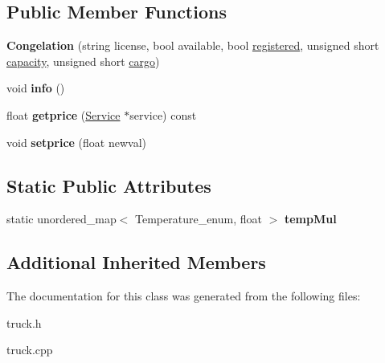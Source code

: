 \subsection*{Public Member Functions}
\begin{DoxyCompactItemize}
\item 
\mbox{\label{class_congelation_a320f8a45809dbe0d770f9f77d49b3629}} 
{\bfseries Congelation} (string license, bool available, bool \hyperlink{class_truck_a80b8405cf7a15b236fef70116f99c4fb}{registered}, unsigned short \hyperlink{class_truck_a14541fad6d47c606ce4e1bd150a68a23}{capacity}, unsigned short \hyperlink{class_truck_a968fc6b1a6171a03e4254d6615da4ecd}{cargo})
\item 
\mbox{\label{class_congelation_ac2f7cb9aeeeb9428a9a973e6a2c63942}} 
void {\bfseries info} ()
\item 
\mbox{\label{class_congelation_a5a37727f0b16e4d250e4576c637392ea}} 
float {\bfseries getprice} (\hyperlink{class_service}{Service} $\ast$service) const
\item 
\mbox{\label{class_congelation_a8da05aa8ea57feefdcbd3bae457af06f}} 
void {\bfseries setprice} (float newval)
\end{DoxyCompactItemize}
\subsection*{Static Public Attributes}
\begin{DoxyCompactItemize}
\item 
\mbox{\label{class_congelation_aa0cf9fa825aa450ff04d58e5e733706b}} 
static unordered\+\_\+map$<$ Temperature\+\_\+enum, float $>$ {\bfseries temp\+Mul}
\end{DoxyCompactItemize}
\subsection*{Additional Inherited Members}


The documentation for this class was generated from the following files\+:\begin{DoxyCompactItemize}
\item 
truck.\+h\item 
truck.\+cpp\end{DoxyCompactItemize}
